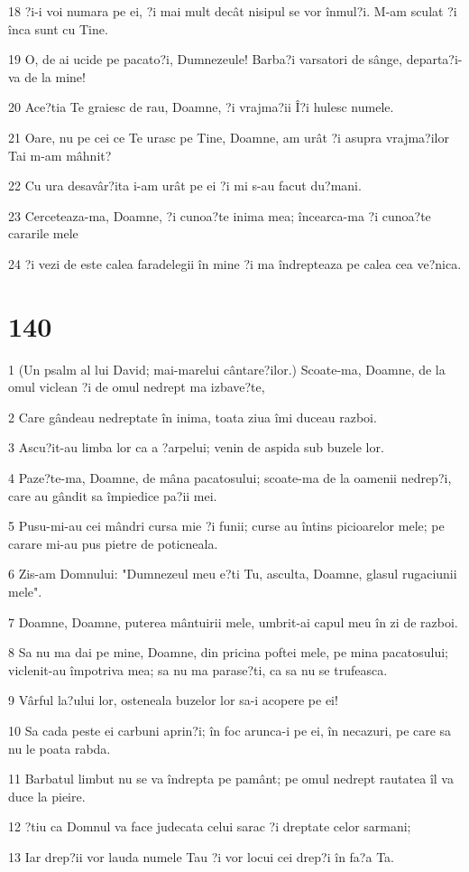 \par 18 ?i-i voi numara pe ei, ?i mai mult decât nisipul se vor înmul?i. M-am sculat ?i înca sunt cu Tine.
\par 19 O, de ai ucide pe pacato?i, Dumnezeule! Barba?i varsatori de sânge, departa?i-va de la mine!
\par 20 Ace?tia Te graiesc de rau, Doamne, ?i vrajma?ii Î?i hulesc numele.
\par 21 Oare, nu pe cei ce Te urasc pe Tine, Doamne, am urât ?i asupra vrajma?ilor Tai m-am mâhnit?
\par 22 Cu ura desavâr?ita i-am urât pe ei ?i mi s-au facut du?mani.
\par 23 Cerceteaza-ma, Doamne, ?i cunoa?te inima mea; încearca-ma ?i cunoa?te cararile mele
\par 24 ?i vezi de este calea faradelegii în mine ?i ma îndrepteaza pe calea cea ve?nica.

\chapter{140}

\par 1 (Un psalm al lui David; mai-marelui cântare?ilor.) Scoate-ma, Doamne, de la omul viclean ?i de omul nedrept ma izbave?te,
\par 2 Care gândeau nedreptate în inima, toata ziua îmi duceau razboi.
\par 3 Ascu?it-au limba lor ca a ?arpelui; venin de aspida sub buzele lor.
\par 4 Paze?te-ma, Doamne, de mâna pacatosului; scoate-ma de la oamenii nedrep?i, care au gândit sa împiedice pa?ii mei.
\par 5 Pusu-mi-au cei mândri cursa mie ?i funii; curse au întins picioarelor mele; pe carare mi-au pus pietre de poticneala.
\par 6 Zis-am Domnului: "Dumnezeul meu e?ti Tu, asculta, Doamne, glasul rugaciunii mele".
\par 7 Doamne, Doamne, puterea mântuirii mele, umbrit-ai capul meu în zi de razboi.
\par 8 Sa nu ma dai pe mine, Doamne, din pricina poftei mele, pe mina pacatosului; viclenit-au împotriva mea; sa nu ma parase?ti, ca sa nu se trufeasca.
\par 9 Vârful la?ului lor, osteneala buzelor lor sa-i acopere pe ei!
\par 10 Sa cada peste ei carbuni aprin?i; în foc arunca-i pe ei, în necazuri, pe care sa nu le poata rabda.
\par 11 Barbatul limbut nu se va îndrepta pe pamânt; pe omul nedrept rautatea îl va duce la pieire.
\par 12 ?tiu ca Domnul va face judecata celui sarac ?i dreptate celor sarmani;
\par 13 Iar drep?ii vor lauda numele Tau ?i vor locui cei drep?i în fa?a Ta.

